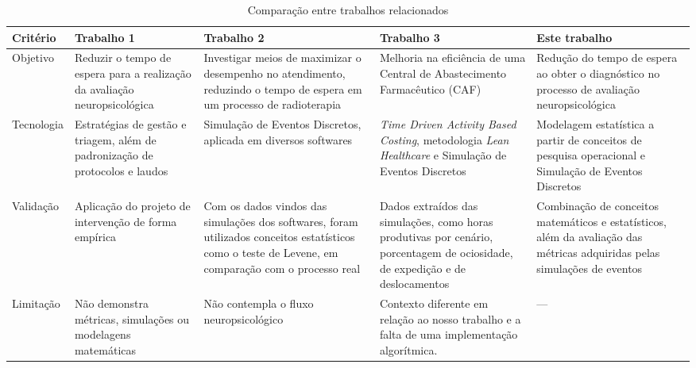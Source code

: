 \documentclass[
    12pt,
    openright,
    oneside,
    a4paper,
    english,
    brazil
]{abntex2}
\begin{document}
\begin{table}[H]
    \centering
    \caption{Comparação entre trabalhos relacionados}
    \label{tab:trabalhos_relacionados}
    
    \tiny %
    
    \setlength{\tabcolsep}{4pt} %
    
    \begin{tabularx}{\textwidth}{p{1.5cm}|Y|Y|Y|Y}
        \toprule
        \textbf{Critério} & \textbf{Trabalho 1} & \textbf{Trabalho 2} & \textbf{Trabalho 3} & \textbf{Este trabalho} \\
        \midrule

        Objetivo 
        & Reduzir o tempo de espera para a realização da avaliação neuropsicológica 
        & Investigar meios de maximizar o desempenho no atendimento, reduzindo o tempo de espera em um processo de radioterapia 
				& Melhoria na eficiência de uma Central de Abastecimento Farmacêutico (CAF)
        & Redução do tempo de espera ao obter o diagnóstico no processo de avaliação neuropsicológica \\
        \midrule

        Tecnologia 
        & Estratégias de gestão e triagem, além de padronização de protocolos e laudos
				& Simulação de Eventos Discretos, aplicada em diversos softwares 
				& \textit{Time Driven Activity Based Costing}, metodologia \textit{Lean Healthcare} e Simulação de Eventos Discretos
        & Modelagem estatística a partir de conceitos de pesquisa operacional e Simulação de Eventos Discretos \\
        \midrule

        Validação 
        & Aplicação do projeto de intervenção de forma empírica
        & Com os dados vindos das simulações dos softwares, foram utilizados conceitos estatísticos como o teste de Levene, em comparação com o processo real
        & Dados extraídos das simulações, como horas produtivas por cenário, porcentagem de ociosidade, de expedição e de deslocamentos
        & Combinação de conceitos matemáticos e estatísticos, além da avaliação das métricas adquiridas pelas simulações de eventos \\
        \midrule

        Limitação 
        & Não demonstra métricas, simulações ou modelagens matemáticas
        & Não contempla o fluxo neuropsicológico
        & Contexto diferente em relação ao nosso trabalho e a falta de uma implementação algorítmica.
        & --- \\
        
        \bottomrule
    \end{tabularx}
    
\end{table}
\end{document}

